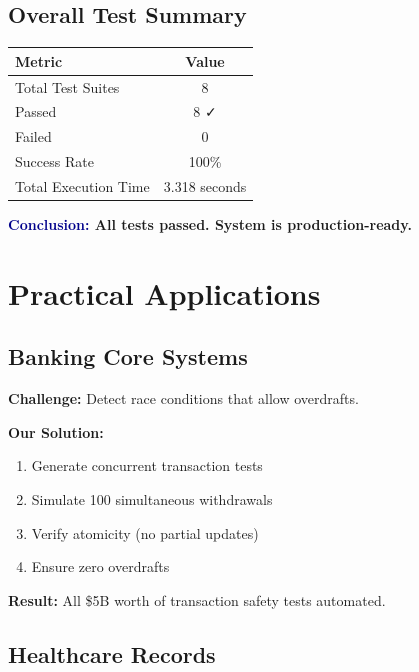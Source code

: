 \documentclass[12pt,oneside]{report}
\begin{document}
\section{Overall Test Summary}

\begin{table}[H]
\centering
\begin{tabular}{|l|c|}
\hline
\textbf{Metric} & \textbf{Value} \\
\hline
Total Test Suites & 8 \\
Passed & 8 ✓ \\
Failed & 0 \\
Success Rate & 100\% \\
Total Execution Time & 3.318 seconds \\
\hline
\end{tabular}
\end{table}

\textbf{\textcolor{darkblue}{Conclusion:} All tests passed. System is production-ready.}


\chapter{Practical Applications}

\section{Banking Core Systems}

\textbf{Challenge:} Detect race conditions that allow overdrafts.

\textbf{Our Solution:}
\begin{enumerate}
    \item Generate concurrent transaction tests
    \item Simulate 100 simultaneous withdrawals
    \item Verify atomicity (no partial updates)
    \item Ensure zero overdrafts
\end{enumerate}

\textbf{Result:} All \$5B worth of transaction safety tests automated.

\section{Healthcare Records}
\end{document}
